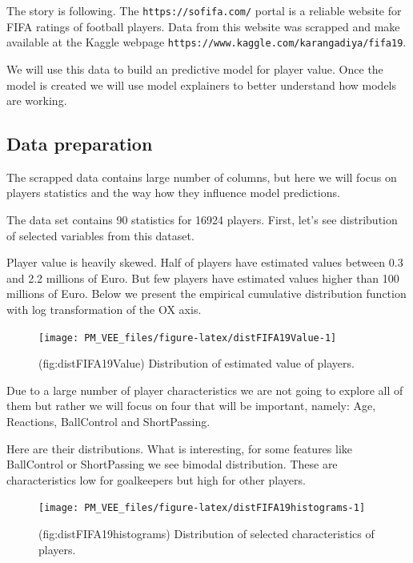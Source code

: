\documentclass[12pt,]{krantz}
\begin{document}
The story is following. The \texttt{https://sofifa.com/} portal is a reliable website for FIFA ratings of football players. Data from this website was scrapped and make available at the Kaggle webpage \texttt{https://www.kaggle.com/karangadiya/fifa19}.

We will use this data to build an predictive model for player value. Once the model is created we will use model explainers to better understand how models are working.

\hypertarget{data-preparation-1}{%
\subsection{Data preparation}\label{data-preparation-1}}

The scrapped data contains large number of columns, but here we will focus on players statistics and the way how they influence model predictions.

The data set contains 90 statistics for 16924 players. First, let's see distribution of selected variables from this dataset.

Player value is heavily skewed. Half of players have estimated values between 0.3 and 2.2 millions of Euro. But few players have estimated values higher than 100 millions of Euro. Below we present the empirical cumulative distribution function with log transformation of the OX axis.

\begin{figure}

{\centering \texttt{[image: PM\_VEE\_files/figure-latex/distFIFA19Value-1]} 

}

\caption{(fig:distFIFA19Value) Distribution of estimated value of players.}\label{fig:distFIFA19Value}
\end{figure}

Due to a large number of player characteristics we are not going to explore all of them but rather we will focus on four that will be important, namely: Age, Reactions, BallControl and ShortPassing.

Here are their distributions. What is interesting, for some features like BallControl or ShortPassing we see bimodal distribution. These are characteristics low for goalkeepers but high for other players.

\begin{figure}

{\centering \texttt{[image: PM\_VEE\_files/figure-latex/distFIFA19histograms-1]} 

}

\caption{(fig:distFIFA19histograms) Distribution of selected characteristics of players.}\label{fig:distFIFA19histograms}
\end{figure}
\end{document}
